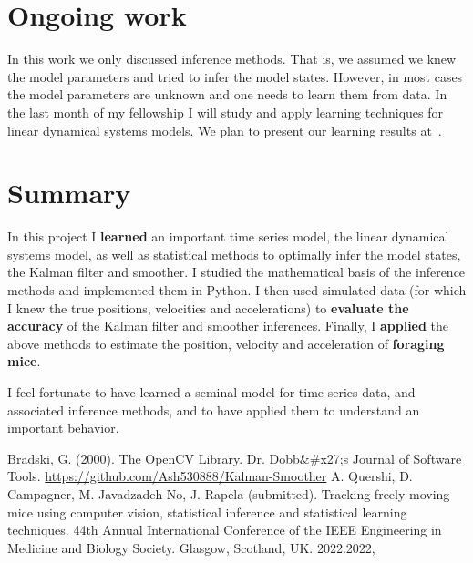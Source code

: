 \documentclass[12pt]{article}
\begin{document}
\section{Ongoing work}

In this work we only discussed inference methods. That is, we assumed we knew
the model parameters and tried to infer the model states. However, in most
cases the model parameters are unknown and one needs to learn them from data.
In the last month of my fellowship I will study and apply learning techniques
for linear dynamical systems models. We plan to present our learning results
at~\cite{c3}.

\section{Summary}

In this project I \textbf{learned} an important time series model, the linear
dynamical systems model, as well as statistical methods to optimally infer the
model states, the Kalman filter and smoother. I studied the mathematical basis
of the inference methods and implemented them in Python.
%
I then used simulated data (for which I knew the true positions, velocities and
accelerations) to \textbf{evaluate the accuracy} of the Kalman filter and
smoother inferences.
%
Finally, I \textbf{applied} the above methods to estimate the position, velocity and
acceleration of \textbf{foraging mice}.

I feel fortunate to have learned a seminal model for time series data, and
associated inference methods, and to have applied them to understand an
important behavior.

\begin{thebibliography}{99}

 Bradski, G. (2000). The OpenCV Library. Dr. Dobb\&\#x27;s Journal of Software Tools.
 \url{https://github.com/Ash530888/Kalman-Smoother}
 A. Quershi, D. Campagner, M. Javadzadeh No, J. Rapela (submitted).  Tracking freely moving mice using computer vision, statistical inference and statistical learning techniques. 44th Annual International Conference of the IEEE Engineering in Medicine and Biology Society.  Glasgow, Scotland, UK. 2022.2022, 

\end{thebibliography}
\end{document}
